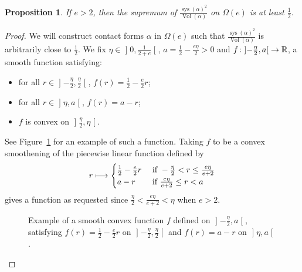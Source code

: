 \documentclass[10pt,a4paper]{amsart}
\DeclareMathOperator{\vol}{Vol}
\DeclareMathOperator{\sys}{sys}
\newcommand{\bbR}{\mathbb{R}}
\renewcommand*{\to}{\mathchoice{\longrightarrow}{\rightarrow}{\rightarrow}{\rightarrow}}
\let\oldmapsto\mapsto
\renewcommand*{\mapsto}{\mathchoice{\longmapsto}{\oldmapsto}{\oldmapsto}{\oldmapsto}}
\newtheorem{prop}[theo]{Proposition}
\theoremstyle{definition}\newtheorem{defi}[theo]{Definition}
\begin{document}
\begin{prop}\label{prop:optimal_constant}
If $e > 2$, then the supremum of $\frac{\sys(\alpha)^2}{\vol(\alpha)}$ on $\Omega(e)$ is at least $\frac{1}{2}$.
\end{prop}

\begin{proof}
We will construct contact forms $\alpha$ in $\Omega(e)$ such that $\frac{\sys(\alpha)^2}{\vol(\alpha)}$ is arbitrarily close to $\frac{1}{2}$. We fix $\eta \in\mathopen{]}0, \frac{1}{2+e}\mathclose{[}$, $a = \frac{1}{2} - \frac{e \eta}{2} > 0$ and $f \colon\mathopen{]}-\frac{\eta}{2}, a\mathclose{[}\to \bbR$, a smooth function satisfying:
\begin{itemize}
\item for all $r \in\mathopen{]}-\frac{\eta}{2}, \frac{\eta}{2}\mathclose{[}$, $f(r) = \frac{1}{2} - \frac{e}{2}r$;
\item for all $r \in\mathopen{]}\eta, a\mathclose{[}$, $f(r) = a - r$;
\item $f$ is convex on $\mathopen{]}\frac{\eta}{2}, \eta\mathclose{[}$.
\end{itemize}

See Figure~\ref{fig:interpolation} for an example of such a function. Taking $f$ to be a convex smoothening of the piecewise linear function defined by
\[
r \mapsto
\begin{cases}
\frac{1}{2} - \frac{e}{2}r &\text{ if } - \frac{\eta}{2} < r \leq \frac{e \eta}{e+2} \\
a - r &\text{ if } \frac{e \eta}{e+2} \leq r < a
\end{cases}
\]
gives a function as requested since $\frac{\eta}{2} < \frac{e \eta}{e+2} < \eta$ when $e > 2$.

\begin{figure}[!h]
\centering
{}
\caption{Example of a smooth convex function $f$ defined on $\mathopen{]}-\frac{\eta}{2}, a\mathclose{[}$, satisfying $f(r)=\frac{1}{2} - \frac{e}{2}r$ on
$\mathopen{]}-\frac{\eta}{2}, \frac{\eta}{2}\mathclose{[}$ and $f(r)=a-r$ on $\mathopen{]}\eta, a\mathclose{[}$.}
\label{fig:interpolation}
\end{figure}


\end{proof}
\end{document}
